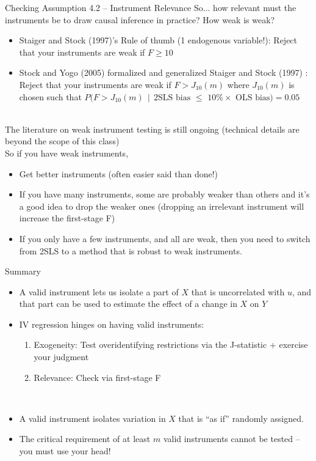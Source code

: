 \documentclass[notes,10pt, aspectratio=169]{beamer}
\begin{document}
\begin{frame}{Checking Assumption 4.2 -- Instrument Relevance}
So... how relevant must the instruments be to draw causal inference in practice? How weak is weak?

\begin{itemize}
    \item Staiger and Stock (1997)’s Rule of thumb (1 endogenous variable!): Reject that your instruments are weak if $F\geq10$
    \item Stock and Yogo (2005) formalized and generalized Staiger and Stock (1997) : Reject that your instruments are weak if $F > J_{10}(m)$ where $J_{10}(m)$ is chosen such that $P(F > J_{10}(m) ~~|~~ \text{2SLS bias $\leq$ 10\% $\times$ OLS bias)}= 0.05$

\end{itemize}\\[1em]

The literature on weak instrument testing is still ongoing (technical details are beyond the scope of this class)\\[1em]

So if you have weak instruments,
\begin{itemize}
    \item Get better instruments (often easier said than done!)
    \item If you have many instruments, some are probably weaker than others and it’s a good idea to drop the weaker ones (dropping an irrelevant instrument will increase the first-stage F)
    \item If you only have a few instruments, and all are weak, then you need to switch from 2SLS to a method that is robust to weak instruments.
\end{itemize}
\end{frame}

\begin{frame}{Summary}
\begin{itemize}
    \item A valid instrument lets us isolate a part of $X$ that is uncorrelated with $u$, and that part can be used to estimate the effect of a change in $X$ on $Y$\\[1em]
    \item IV regression hinges on having valid instruments:
    \begin{enumerate}
        \item Exogeneity: Test overidentifying restrictions via the J-statistic + exercise your judgment 
        \item Relevance: Check via first-stage F
    \end{enumerate}\\[1em]
    \item A valid instrument isolates variation in $X$ that is ``as if'' randomly assigned.\\[1em]
    \item The critical requirement of at least $m$ valid instruments cannot be tested -- you must use your head!
\end{itemize}
\end{frame}
\end{document}
